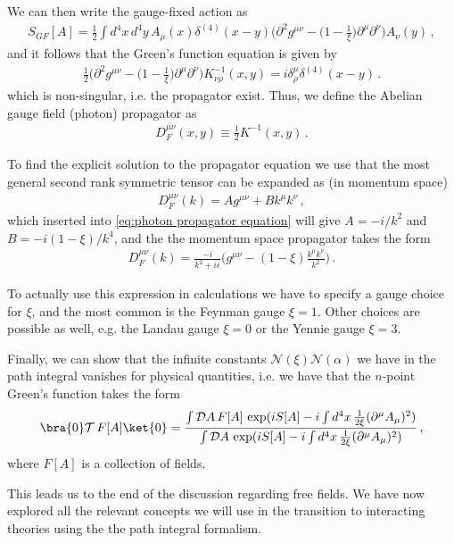 We can then write the gauge-fixed action as
\begin{align}\label{eq:Abelian gauge fixed action}
    S_{GF}[A]=\frac{1}{2}\int d^{4}x\,d^{4}y\,A_{\mu}(x)\delta^{(4)}(x-y)\big(\partial^{2}g^{\mu\nu}-\Big(1-\frac{1}{\xi}\Big)\partial^{\mu}\partial^{\nu}\big)A_{\nu}(y)\,,
\end{align}
and it follows that the Green's function equation is given by
\begin{align}\label{eq:photon propagator equation}
    \frac{1}{2}\big(\partial^{2}g^{\mu\nu}-\Big(1-\frac{1}{\xi}\Big)\partial^{\mu}\partial^{\nu}\big)K_{\nu\rho}^{-1}(x,y)=i\delta_{\rho}^{\mu}\delta^{(4)}(x-y)\,.
\end{align}
which is non-singular, i.e. the propagator exist. Thus, we define the Abelian gauge field (photon) propagator as
\begin{align}
    D_{F}^{\mu\nu}(x,y)\equiv\frac{1}{2}K^{-1}(x,y)\,.
\end{align}

To find the explicit solution to the propagator equation we use that the most general second rank symmetric tensor can be expanded as (in momentum space)
\begin{align}\label{eq:parametrization of propagator}
    D_{F}^{\mu\nu}(k)=Ag^{\mu\nu}+Bk^{\mu}k^{\nu}\,,
\end{align}
which inserted into \cref{eq:photon propagator equation} will give $A=-i/k^{2}$ and $B=-i(1-\xi)/k^{4}$, and the the momentum space propagator takes the form
\begin{align}\label{eq:photon propagator without gauge choice}
    D_{F}^{\mu\nu}(k)=\frac{-i}{k^{2}+i\epsilon}\Big(g^{\mu\nu}-(1-\xi)\frac{k^{\mu}k^{\nu}}{k^{2}}\Big)\,.
\end{align}

To actually use this expression in calculations we have to specify a gauge choice for $\xi$, and the most common is the Feynman gauge $\xi=1$. Other choices are possible as well, e.g. the Landau gauge $\xi=0$ or the Yennie gauge $\xi=3$.

Finally, we can show that the infinite constants $\mathcal{N}(\xi)\mathcal{N}(\alpha)$ we have in the path integral vanishes for physical quantities, i.e. we have that the $n$-point Green's function takes the form
\begin{align}
    \bra{0}\mathcal{T}\,F[A]\ket{0}=\frac{\int\mathcal{D}A\,F[A]\,\exp(iS[A]-i\int d^{4}x\,\frac{1}{2\xi}(\partial^{\mu}A_{\mu})^{2})}{\int\mathcal{D}A\,\exp(iS[A]-i\int d^{4}x\,\frac{1}{2\xi}(\partial^{\mu}A_{\mu})^{2})}\,,
\end{align}
where $F[A]$ is a collection of fields.

This leads us to the end of the discussion regarding free fields. We have now explored all the relevant concepts we will use in the transition to interacting theories using the the path integral formalism.